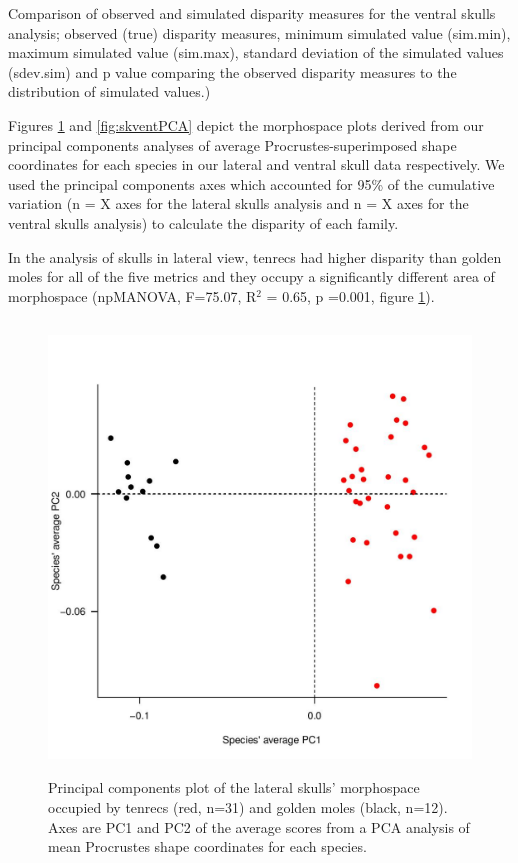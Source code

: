 \documentclass[12pt,a4paper]{article}
\begin{document}
\begin{table}[H]				

\centering
\caption{Comparison of observed and simulated disparity measures for the ventral skulls analysis; observed (true) disparity measures, minimum simulated value (sim.min), maximum simulated value (sim.max), standard deviation of the simulated values (sdev.sim) and p value comparing the observed disparity measures to the distribution of simulated values.)}


\label{tab:skvent_sims} 
\end{table}


Figures  \ref{fig:sklatPCA} and \ref{fig:skventPCA} depict the morphospace plots derived from our principal components analyses of average Procrustes-superimposed shape coordinates for each species in our lateral and ventral skull data respectively. We used the principal components axes which accounted for 95\% of the cumulative variation (n = X axes for the lateral skulls analysis and n = X axes for the ventral skulls analysis) to calculate the disparity of each family. 

In the analysis of skulls in lateral view, tenrecs had higher disparity than golden moles for all of the five metrics and they occupy a significantly different area of morphospace (npMANOVA, F=75.07, R$^{2}$ = 0.65,  p =0.001, figure \ref{fig:sklatPCA}).  


\begin{figure}[H]
\centering
\includegraphics[width=12cm, height=12cm, keepaspectratio=true]
{figures/sklat_tenrec+gmole_PCA.jpg}
\caption{Principal components plot of the lateral skulls' morphospace occupied by tenrecs (red, n=31) and golden moles (black, n=12). Axes are PC1 and PC2 of the average scores from a PCA analysis of mean Procrustes shape coordinates for each species. }
\label{fig:sklatPCA}
\end{figure}
\end{document}
